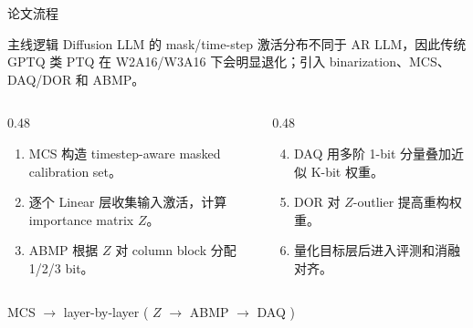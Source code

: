 \documentclass[aspectratio=169,11pt]{ctexbeamer}
\begin{document}
\begin{frame}{论文流程}
  \small
  \begin{block}{主线逻辑}
    Diffusion LLM 的 mask/time-step 激活分布不同于 AR LLM，因此传统 GPTQ 类 PTQ 在 W2A16/W3A16 下会明显退化；引入 binarization、MCS、DAQ/DOR 和 ABMP。
  \end{block}

  \begin{columns}[T]
    \begin{column}{0.48\linewidth}
      \begin{enumerate}
        \item MCS 构造 timestep-aware masked calibration set。
        \item 逐个 Linear 层收集输入激活，计算 importance matrix \(Z\)。
        \item ABMP 根据 \(Z\) 对 column block 分配 1/2/3 bit。
      \end{enumerate}
    \end{column}
    \begin{column}{0.48\linewidth}
      \begin{enumerate}
        \setcounter{enumi}{3}
        \item DAQ 用多阶 1-bit 分量叠加近似 K-bit 权重。
        \item DOR 对 \(Z\)-outlier 提高重构权重。
        \item 量化目标层后进入评测和消融对齐。
      \end{enumerate}
    \end{column}
  \end{columns}

  \vspace{0.18cm}
  \footnotesize
  MCS \(\rightarrow\) layer-by-layer ( \(Z\) \(\rightarrow\) ABMP \(\rightarrow\) DAQ )
\end{frame}
\end{document}
